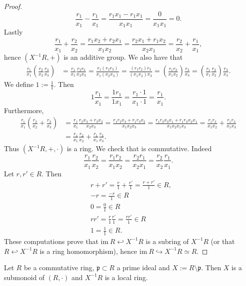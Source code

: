 \begin{proof}
    $$\frac{r_1}{x_1}-\frac{r_1}{x_1}=\frac{r_1x_1-r_1x_1}{x_1x_1} = \frac{0}{x_1x_1}= 0.$$
    Lastly 
    $$\frac{r_1}{x_1}+\frac{r_2}{x_2} = \frac{r_1x_2+r_2x_1}{x_1x_2} = \frac{r_2x_1+r_1x_2}{x_2x_1} = \frac{r_2}{x_2}+\frac{r_1}{x_1},$$
    hence $(X^{-1}R,+)$ is an additive group. We also have that 
    \begin{align*}
        \frac{r_1}{x_1}\left(\frac{r_2}{x_2}\frac{r_3}{x_3}\right) &= \frac{r_1}{x_1}\frac{r_2r_3}{x_2x_3} = \frac{r_1(r_2r_3)}{x_1(x_2x_3)} = \frac{(r_1r_2)r_3}{(x_1x_2)x_3} = \left(\frac{r_1r_2}{x_1x_2}\right)\frac{r_3}{x_3} = \left(\frac{r_1}{x_1}\frac{r_2}{x_2} \right)\frac{r_3}{x_3}.
    \end{align*}
    We define $1 := \frac{1}{1}$. Then 
    $$1 \frac{r_1}{x_1} = \frac{1r_1}{1x_1} = \frac{r_1\cdot 1}{x_1\cdot 1} = \frac{r_1}{x_1}.$$
    Furthermore,
    \begin{align*}
        \frac{r_1}{x_1}\left(\frac{r_2}{x_2}+\frac{r_3}{x_3}\right) &= \frac{r_1}{x_1}\frac{r_2x_3+r_3x_2}{x_2x_3} = \frac{r_1r_2x_3+r_1r_3x_2}{x_1x_2x_3} = \frac{r_1r_2x_3x_1+r_1r_3x_2x_1}{x_1x_2x_1x_3} = \frac{r_1r_2}{x_1x_2} + \frac{r_1r_3}{x_1x_3}\\
        &= \frac{r_1}{x_1}\frac{r_2}{x_2}+\frac{r_1}{x_1}\frac{r_3}{x_3}.
    \end{align*}
    Thus $(X^{-1}R,+,\cdot)$ is a ring. We check that is commutative. Indeed
    $$\frac{r_1}{x_1}\frac{r_2}{x_2} = \frac{r_1r_2}{x_1x_2}= \frac{r_2r_1}{x_2x_1}=\frac{r_2}{x_2}\frac{r_1}{x_1}.$$
    Let $r,r'\in R$. Then 
    \begin{align*} 
        &r + r' = \frac{r}{1}+ \frac{r'}{1} = \frac{r+r'}{1}\in R,\\
        &-r = \frac{-r}{1}\in R\\
        &0 = \frac{0}{1}\in R\\
        &rr' = \frac{r}{1}\frac{r'}{1}= \frac{rr'}{1}\in R\\
        & 1 = \frac{1}{1}\in R.
    \end{align*}
    These computations prove that $\text{im}\ R\hookleftarrow X^{-1}R$ is a subring of $X^{-1}R$ (or that $R\hookleftarrow X^{-1}R$ is a ring homomorphism), hence $\text{im}\ R\hookrightarrow X^{-1}R\simeq R$. 
\end{proof}
\begin{proposition}
     Let $R$ be a commutative ring, $\mathfrak{p}\subset R$ a prime ideal and $X := R\setminus \mathfrak{p}$. Then $X$ is a submonoid of $(R,\cdot)$ and $X^{-1}R$ is a local ring. 
\end{proposition}
